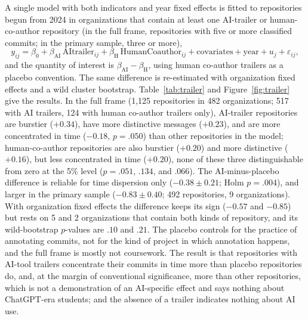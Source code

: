 \documentclass[acmsmall,screen,review,anonymous]{acmart}
\begin{document}
A single model with both indicators and year fixed effects is fitted to repositories begun from 2024 in organizations that contain at least one AI-trailer or human-co-author repository (in the full frame, repositories with five or more classified commits; in the primary sample, three or more),
\begin{equation}
y_{ij} = \beta_0 + \beta_{\mathrm{AI}}\,\mathrm{AItrailer}_{ij} + \beta_{\mathrm{H}}\,\mathrm{HumanCoauthor}_{ij} + \text{covariates} + \text{year} + u_j + \varepsilon_{ij},
\label{eq:trailer}
\end{equation}
and the quantity of interest is $\beta_{\mathrm{AI}} - \beta_{\mathrm{H}}$, using human co-author trailers as a placebo convention. The same difference is re-estimated with organization fixed effects and a wild cluster bootstrap. Table~\ref{tab:trailer} and Figure~\ref{fig:trailer} give the results. In the full frame (1,125 repositories in 482 organizations; 517 with AI trailers, 124 with human co-author trailers only), AI-trailer repositories are burstier ($+0.34$), have more distinctive messages ($+0.23$), and are more concentrated in time ($-0.18$, $p = .050$) than other repositories in the model; human-co-author repositories are also burstier ($+0.20$) and more distinctive ($+0.16$), but less concentrated in time ($+0.20$), none of these three distinguishable from zero at the 5\% level ($p = .051$, $.134$, and $.066$). The AI-minus-placebo difference is reliable for time dispersion only ($-0.38 \pm 0.21$; Holm $p = .004$), and larger in the primary sample ($-0.83 \pm 0.40$; 492 repositories, 9 organizations). With organization fixed effects the difference keeps its sign ($-0.57$ and $-0.85$) but rests on 5 and 2 organizations that contain both kinds of repository, and its wild-bootstrap $p$-values are $.10$ and $.21$. The placebo controls for the practice of annotating commits, not for the kind of project in which annotation happens, and the full frame is mostly not coursework. The result is that repositories with AI-tool trailers concentrate their commits in time more than placebo repositories do, and, at the margin of conventional significance, more than other repositories, which is not a demonstration of an AI-specific effect and says nothing about ChatGPT-era students; and the absence of a trailer indicates nothing about AI use.


\end{document}
